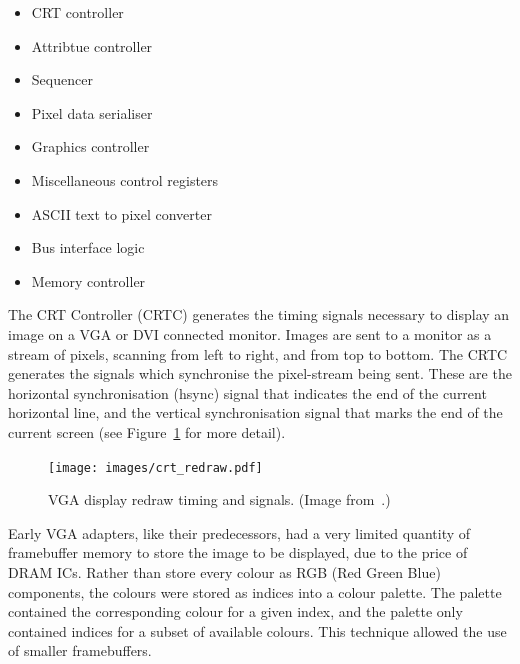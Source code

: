 \begin{itemize}
  \item CRT controller
  \item Attribtue controller
  \item Sequencer
  \item Pixel data serialiser
  \item Graphics controller
  \item Miscellaneous control registers
  \item ASCII text to pixel converter
  \item Bus interface logic
  \item Memory controller
\end{itemize}


The CRT Controller (CRTC)
generates the timing signals necessary to display an image on a VGA or DVI
connected monitor. Images are sent to a monitor as a stream of pixels, scanning
from left to right, and from top to bottom. The CRTC generates the signals which
synchronise the pixel-stream being sent. These are the horizontal
synchronisation
(hsync) signal that indicates the end of the current horizontal line, and the
vertical synchronisation signal that marks the end of the current screen (see
Figure~\ref{INTRO_CRT_Redraw} for more detail).

\begin{figure}[h!]
\begin{center}
\texttt{[image: images/crt\_redraw.pdf]}
\end{center}
\caption[VGA display redraw timing and signals]{VGA display redraw timing and
signals. (Image from~\cite{knutsson:fbg}.)}
\label{INTRO_CRT_Redraw}
\end{figure}

Early VGA adapters, like their predecessors, had a very limited quantity of
framebuffer memory to store the image to be displayed, due to the price of DRAM
ICs. Rather than store every colour as RGB (Red Green Blue) components, the colours were stored as indices into
a colour palette. The palette contained the corresponding colour for a given
index, and the palette only contained indices for a subset of available colours.
This technique allowed the use of smaller framebuffers.


